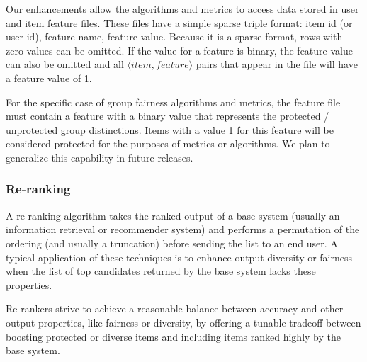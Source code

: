 Our enhancements allow the algorithms and metrics to access data stored in user and item feature files. These files have a simple sparse triple format: item id (or user id), feature name, feature value. Because it is a sparse format, rows with zero values can be omitted. If the value for a feature is binary, the feature value can also be omitted and all $ \langle item, feature \rangle$ pairs that appear in the file will have a feature value of 1.

For the specific case of group fairness algorithms and metrics, the feature file must contain a feature with a binary value that represents the protected / unprotected group distinctions. Items with a value 1 for this feature will be considered protected for the purposes of metrics or algorithms. We plan to generalize this capability in future releases.

\subsubsection{Re-ranking}
\label{sec:rerank}
A re-ranking algorithm takes the ranked output of a base system (usually an information retrieval or recommender system) and performs a permutation of the ordering (and usually a truncation) before sending the list to an end user. A typical application of these techniques is to enhance output diversity or fairness when the list of top candidates returned by the base system lacks these properties.


Re-rankers strive to achieve a reasonable balance between accuracy and other output properties, like fairness or diversity, by offering a tunable tradeoff between boosting protected or diverse items and including items ranked highly by the base system. 

